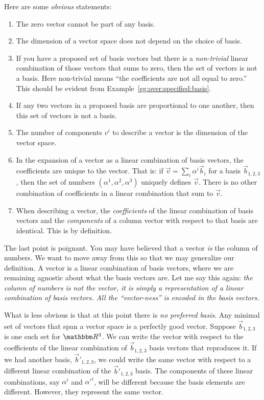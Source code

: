\documentclass[12pt, oneside]{report}    %
\begin{document}
Here are some \emph{obvious} statements:
\begin{enumerate}
    \item The zero vector cannot be part of any basis.
    \item The dimension of a vector space does not depend on the choice of basis.
    \item If you have a proposed set of basis vectors but there is a \emph{non-trivial} linear combination of those vectors that sums to zero, then the set of vectors is not a basis. Here non-trivial means ``the coefficients are not all equal to zero.'' This should be evident from Example~\ref{eg:over:specified:basis}.
    \item If any two vectors in a proposed basis are proportional to one another, then this set of vectors is not a basis.
    \item The number of components $v^i$ to describe a vector is the dimension of the vector space.
    \item In the expansion of a vector as a linear combination of basis vectors, the coefficients are unique to the vector. That is: if $\vec{v} = \sum_i \alpha^i\vec{b}_i$ for a basis $\vec{b}_{1,2,3}$, then the set of numbers $(\alpha^1, \alpha^2, \alpha^3)$ uniquely defines $\vec{v}$. There is no other combination of coefficients in a linear combination that sum to $\vec{v}$. 
    \item When describing a vector, the \emph{coefficients} of the linear combination of basis vectors and the \emph{components} of a column vector with respect to that basis are identical. This is by definition. 
\end{enumerate}
The last point is poignant. You may have believed that a vector \emph{is} the column of numbers. We want to move away from this so that we may generalize our definition. A vector is a linear combination of basis vectors, where we are remaining agnostic about what the basis vectors are. Let me say this again: \emph{the column of numbers is not the vector, it is simply a representation of a linear combination of basis vectors. All the ``vector-ness'' is encoded in the basis vectors.}




What is less obvious is that at this point there is \emph{no preferred basis}. Any minimal set of vectors that span a vector space is a perfectly good vector. Suppose $\vec{b}_{1,2,3}$ is one such set for $\RR ^3$. We can write the vector with respect to the coefficients of the linear combination of  $\vec{b}_{1,2,3}$ basis vectors that reproduces it. If we had another basis, $\vec{b}'_{1,2,3}$, we could write the same vector with respect to a different linear combination of the $\vec{b}'_{1,2,3}$ basis. The components of these linear combinations, say $\alpha^i$ and $\alpha'^i$, will be different because the basis elements are different. However, they represent the same vector.
\end{document}

